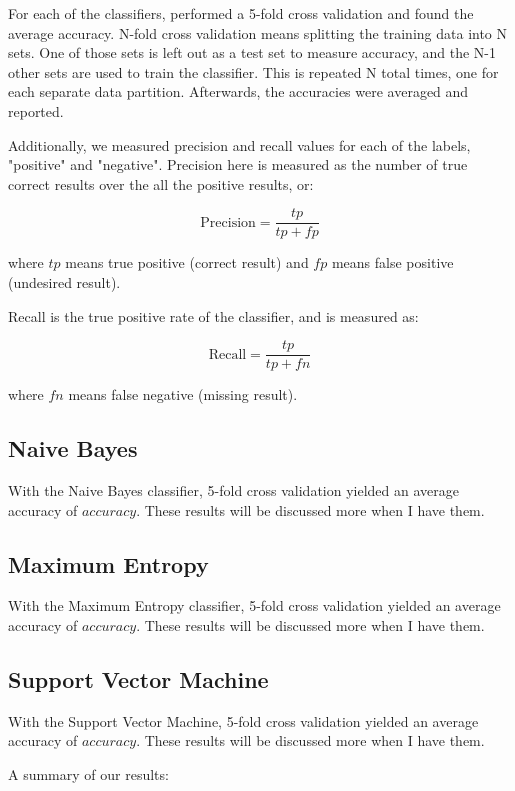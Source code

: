 \documentclass[preprint,pre,floats,aps,amsmath,amssymb,12pt]{revtex4}
\begin{document}
For each of the classifiers, performed a 5-fold cross validation and found the average accuracy. N-fold cross validation means splitting the training data into N sets. One of those sets is left out as a test set to measure accuracy, and the N-1 other sets are used to train the classifier. This is repeated N total times, one for each separate data partition. Afterwards, the accuracies were averaged and reported. 

Additionally, we measured precision and recall values for each of the labels, "positive" and "negative". Precision here is measured as the number of true correct results over the all the positive results, or: 

\[\text{Precision} = \frac{tp}{tp + fp}\]

where $tp$ means true positive (correct result) and $fp$ means false positive (undesired result).

Recall is the true positive rate of the classifier, and is measured as:

\[\text{Recall} = \frac{tp}{tp + fn}\]

where $fn$ means false negative (missing result).


\subsection{Naive Bayes}

With the Naive Bayes classifier, 5-fold cross validation yielded an average accuracy of $accuracy$. These results will be discussed more when I have them.

\subsection{Maximum Entropy}


With the Maximum Entropy classifier, 5-fold cross validation yielded an average accuracy of $accuracy$. These results will be discussed more when I have them.


\subsection{Support Vector Machine}


With the Support Vector Machine, 5-fold cross validation yielded an average accuracy of $accuracy$. These results will be discussed more when I have them.

A summary of our results: \\
\end{document}
